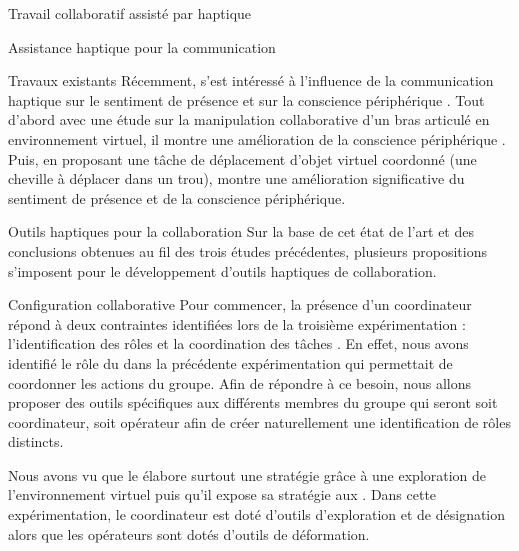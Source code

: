 \documentclass[myfrancais,ngerman,english,french]{mythesis}
\begin{document}
\begin{mychapter}{Travail collaboratif assisté par haptique}
\begin{mysection}{Assistance haptique pour la communication}
\begin{mysubsection}{Travaux existants}
				Récemment,  s'est intéressé à l'influence de la communication haptique sur le sentiment de présence et sur la conscience périphérique .
				Tout d'abord avec une étude sur la manipulation collaborative d'un bras articulé en environnement virtuel, il montre une amélioration de la conscience périphérique .
				Puis, en proposant une tâche de déplacement d'objet virtuel coordonné (une cheville à déplacer dans un trou),  montre une amélioration significative du sentiment de présence et de la conscience périphérique.
			\end{mysubsection}
			\begin{mysubsection}{Outils haptiques pour la collaboration}
				Sur la base de cet état de l'art et des conclusions obtenues au fil des trois études précédentes, plusieurs propositions s'imposent pour le développement d'outils haptiques de collaboration.
				\begin{mysubsubsection}{Configuration collaborative}
					Pour commencer, la présence d'un coordinateur répond à deux contraintes identifiées lors de la troisième expérimentation : l'identification des rôles et la coordination des tâches .
					En effet, nous avons identifié le rôle du  dans la précédente expérimentation qui permettait de coordonner les actions du groupe.
					Afin de répondre à ce besoin, nous allons proposer des outils spécifiques aux différents membres du groupe qui seront soit coordinateur, soit opérateur afin de créer naturellement une identification de rôles distincts.

					Nous avons vu que le  élabore surtout une stratégie grâce à une exploration de l'environnement virtuel puis qu'il expose sa stratégie aux .
					Dans cette expérimentation, le coordinateur est doté d'outils d'exploration et de désignation alors que les opérateurs sont dotés d'outils de déformation.


\end{mysubsubsection}
\end{mysubsection}
\end{mysection}
\end{mychapter}
\end{document}
